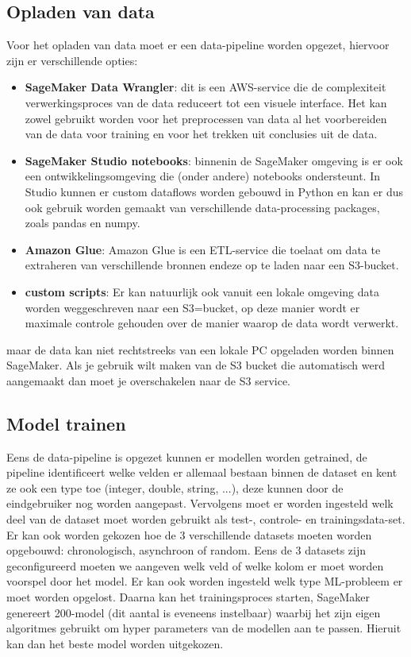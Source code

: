 \subsection{Opladen van data}
Voor het opladen van data moet er een data-pipeline worden opgezet, hiervoor zijn er verschillende opties:
\begin{itemize}
    \item \textbf{SageMaker Data Wrangler}: dit is een AWS-service die de complexiteit verwerkingsproces van de data reduceert tot een visuele interface. Het kan zowel gebruikt worden voor het preprocessen van data al het voorbereiden van de data voor training en voor het trekken uit conclusies uit de data.
    \item  \textbf{SageMaker Studio notebooks}: binnenin de SageMaker omgeving is er ook een ontwikkelingsomgeving die (onder andere) notebooks ondersteunt. In Studio kunnen er custom dataflows worden gebouwd in Python en kan er dus ook gebruik worden gemaakt van verschillende data-processing packages, zoals pandas en numpy.
    \item \textbf{Amazon Glue}:  Amazon Glue is een ETL-service die toelaat om data te extraheren van verschillende bronnen endeze op te laden naar een S3-bucket.
    \item \textbf{custom scripts}: Er kan natuurlijk ook vanuit een lokale omgeving data worden weggeschreven naar een S3=bucket, op deze manier wordt er maximale controle gehouden over de manier waarop de data wordt verwerkt. 
\end{itemize}

 maar de data kan niet rechtstreeks van een lokale PC opgeladen worden binnen SageMaker. Als je gebruik wilt maken van de S3 bucket die automatisch werd aangemaakt dan moet je overschakelen naar de S3 service. 

\subsection{Model trainen}
Eens de data-pipeline is opgezet kunnen er modellen worden getrained, de pipeline identificeert welke velden er allemaal bestaan binnen de dataset en kent ze ook een type toe (integer, double, string, ...), deze kunnen door de eindgebruiker nog worden aangepast. Vervolgens moet er worden ingesteld welk deel van de dataset moet worden gebruikt als test-, controle- en trainingsdata-set. Er kan ook worden gekozen hoe de 3 verschillende datasets moeten worden opgebouwd: chronologisch, asynchroon of random. Eens de 3 datasets zijn geconfigureerd moeten we aangeven welk veld of welke kolom er moet worden voorspel door het model. Er kan ook worden ingesteld welk type ML-probleem er moet worden opgelost. Daarna kan het trainingsproces starten, SageMaker genereert 200-model (dit aantal is eveneens instelbaar) waarbij het zijn eigen algoritmes gebruikt om hyper parameters van de modellen aan te passen. Hieruit kan dan het beste model worden uitgekozen. 

